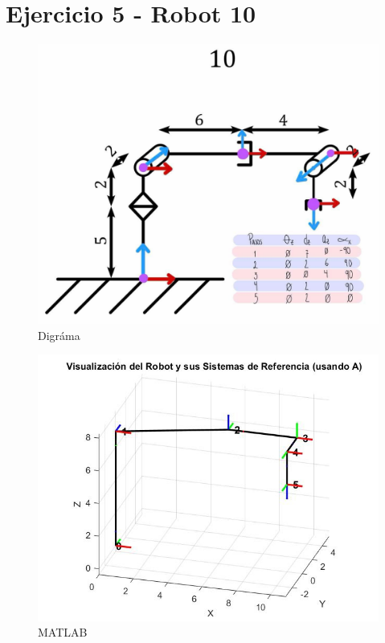 \newpage
\section{Ejercicio 5 - Robot 10}
\begin{figure}[h]
	\centering
	\includegraphics[width=0.55\linewidth]{img/ejercicio_10-dibujo}
	\caption{Digráma}
	\label{fig:ejercicio10-dibujo}
\end{figure}

\begin{figure}[h]
	\centering
	\includegraphics[width=0.55\linewidth]{img/ejercicio_10-matlab}
	\caption{MATLAB}
	\label{fig:ejercicio10-matlab}
\end{figure}
